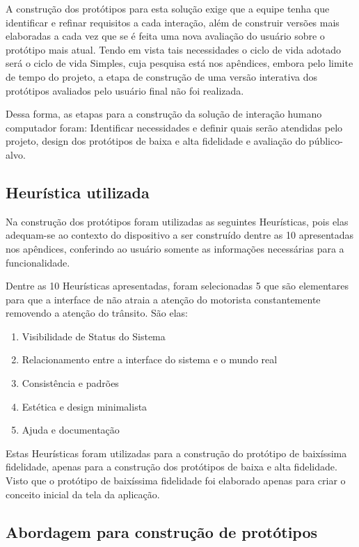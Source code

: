 A construção dos protótipos para esta solução exige que a equipe tenha que identificar e refinar requisitos a cada interação, além de construir versões mais elaboradas a cada vez que se é feita uma nova avaliação do usuário sobre o protótipo mais atual. Tendo em vista tais necessidades o ciclo de vida adotado será o ciclo de vida Simples, cuja pesquisa está nos apêndices, embora pelo limite de tempo do projeto, a etapa de construção de uma versão interativa dos protótipos avaliados pelo usuário final não foi realizada.

Dessa forma, as etapas para a construção da solução de interação humano computador foram: Identificar necessidades e definir quais serão atendidas pelo projeto, design dos protótipos de baixa e alta fidelidade e avaliação do público-alvo.
    
\subsection{Heurística utilizada}

Na construção dos protótipos foram utilizadas as seguintes Heurísticas, pois elas adequam-se ao contexto do dispositivo a ser construído dentre as 10 apresentadas nos apêndices, conferindo ao usuário somente as informações necessárias para a funcionalidade.

Dentre as 10 Heurísticas apresentadas, foram selecionadas 5 que são elementares para que a interface de não atraia a atenção do motorista constantemente removendo a atenção do trânsito. São elas:

\begin{enumerate}
	\item Visibilidade de Status do Sistema
	\item Relacionamento entre a interface do sistema e o mundo real
	\item Consistência e padrões
	\item Estética e design minimalista
	\item Ajuda e documentação
\end{enumerate}

Estas Heurísticas foram utilizadas para a construção do protótipo de baixíssima fidelidade, apenas para a construção dos protótipos de baixa e alta fidelidade. Visto que o protótipo de baixíssima fidelidade foi elaborado apenas para criar o conceito inicial da tela da aplicação.

\subsection{Abordagem para construção de protótipos}

